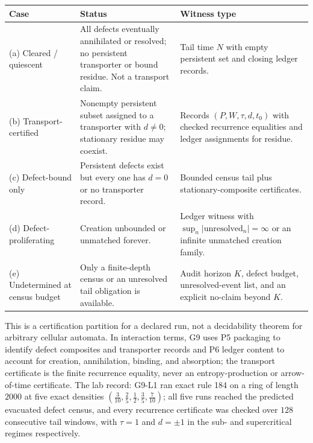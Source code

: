 \documentclass[11pt]{article}
\theoremstyle{definition}
\begin{document}
\begin{center}
\footnotesize
\begin{tabularx}{\textwidth}{@{}lXX@{}}
\toprule
Case & Status & Witness type \\
\midrule
(a) Cleared / quiescent & All defects eventually annihilated or resolved; no persistent transporter or
bound residue. Not a transport claim. & Tail time $N$ with empty persistent set and closing ledger
records. \\
(b) Transport-certified & Nonempty persistent subset assigned to a transporter with $d \neq 0$;
stationary residue may coexist. & Records $(P, W, \tau, d, t_0)$ with checked recurrence equalities and
ledger assignments for residue. \\
(c) Defect-bound only & Persistent defects exist but every one has $d = 0$ or no transporter record. &
Bounded census tail plus stationary-composite certificates. \\
(d) Defect-proliferating & Creation unbounded or unmatched forever. & Ledger witness with
$\sup_n |\mathrm{unresolved}_n| = \infty$ or an infinite unmatched creation family. \\
(e) Undetermined at census budget & Only a finite-depth census or an unresolved tail obligation is
available. & Audit horizon $K$, defect budget, unresolved-event list, and an explicit no-claim beyond
$K$. \\
\bottomrule
\end{tabularx}
\end{center}

This is a certification partition for a declared run, not a decidability theorem for arbitrary
cellular automata. In interaction terms, G9 uses P5 packaging to identify defect composites and
transporter records and P6 ledger content to account for creation, annihilation, binding, and
absorption; the transport certificate is the finite recurrence equality, never an entropy-production
or arrow-of-time certificate. The lab record: G9-L1 ran exact rule 184 on a ring of length $2000$ at
five exact densities $\left(\tfrac{3}{10}, \tfrac{2}{5}, \tfrac12, \tfrac{3}{5},
\tfrac{7}{10}\right)$; all five runs reached the predicted evacuated defect census, and every
recurrence certificate was checked over $128$ consecutive tail windows, with $\tau = 1$ and
$d = \pm 1$ in the sub- and supercritical regimes respectively.
\end{document}
